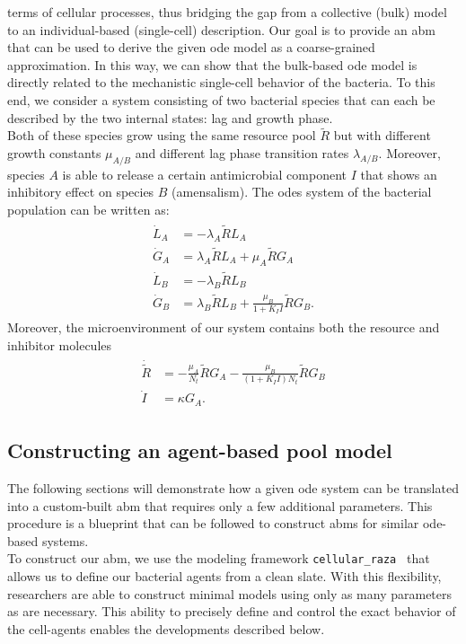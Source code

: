 \documentclass[10pt,1p,authoryear]{elsarticle}
\numberwithin{equation}{section}
\begin{document}
terms of cellular processes, thus bridging the gap from a collective (bulk) model to an individual-based (single-cell) description. Our goal is to provide an \ac{abm} that can be used to derive the given \ac{ode} model as a coarse-grained approximation. In this way, we can show that the bulk-based \ac{ode} model is directly related to the mechanistic
single-cell behavior of the bacteria. To this end, we consider a system consisting of two bacterial species that can each be described by the two internal states: lag and growth phase.\\
%
Both of these species grow using the same resource pool $\tilde{R}$ but with different growth constants
$\mu_{A/B}$ and different lag phase transition rates $\lambda_{A/B}$.
Moreover, species $A$ is able to release a certain antimicrobial component $I$ that shows an
inhibitory effect on species $B$ (amensalism). The \acp{ode} system of the bacterial population can be written as:
%
\begin{align}
    \begin{split}
        \dot{L}_A &= -\lambda_A \tilde{R} L_A\\
        \dot{G}_A &= \lambda_A \tilde{R} L_A + \mu_A \tilde{R} G_A\\
        \dot{L}_B &= -\lambda_B \tilde{R} L_B\\
        \dot{G}_B &= \lambda_B \tilde{R} L_B + \frac{\mu_B}{1 + K_I I} \tilde{R} G_B.
    \end{split}
    \label{eq:spatial_limit_F}
\end{align}
%
Moreover, the microenvironment of our system contains both the resource and inhibitor molecules
\begin{align}
    \begin{split}
        \dot{\tilde{R}} &= -\frac{\mu_A}{N_t} \tilde{R} G_A-\frac{\mu_B}{(1 + K_I I) N_t} \tilde{R} G_B \\
        \dot{I} &= \kappa G_A.
    \end{split}
    \label{eq:spatial_limit_H}
\end{align}
%
\subsection{Constructing an agent-based pool model}
The following sections will demonstrate how a given \ac{ode} system can be translated into a custom-built \ac{abm} that requires only a few additional parameters.
This procedure is a blueprint that can be followed to construct \acp{abm} for similar \ac{ode}-based systems.\\
To construct our \ac{abm}, we use the modeling framework \texttt{cellular\_raza}~\citep{Pleyer2025} that allows us to define our bacterial agents from a clean slate.
With this flexibility, researchers are able to construct minimal models using only as many parameters as are necessary. This ability to precisely define and control the exact behavior of the cell-agents enables the developments described below.
%
\end{document}
